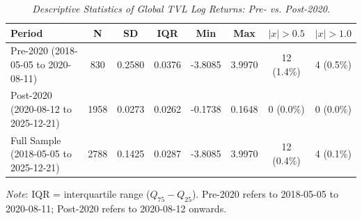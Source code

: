 \begin{table}[h]
  \centering
  \caption{\textit{Descriptive Statistics of Global TVL Log Returns: Pre- vs. Post-2020}.}
  \label{tab:tvldescstats20182025}
  \begin{tabular}{lccccccc}
    \toprule
    \textbf{Period} & \textbf{N} & \textbf{SD} & \textbf{IQR} & \textbf{Min} & \textbf{Max} & \textbf{$|x|>0.5$} & \textbf{$|x|>1.0$} \\ 
    \midrule
    Pre-2020 (2018-05-05 to 2020-08-11) & 830 & 0.2580 & 0.0376 & -3.8085 & 3.9970 & 12 (1.4\%) & 4 (0.5\%) \\ 
    Post-2020 (2020-08-12 to 2025-12-21) & 1958 & 0.0273 & 0.0262 & -0.1738 & 0.1648 & 0 (0.0\%) & 0 (0.0\%) \\ 
    Full Sample (2018-05-05 to 2025-12-21) & 2788 & 0.1425 & 0.0287 & -3.8085 & 3.9970 & 12 (0.4\%) & 4 (0.1\%) \\ 
    \bottomrule
  \end{tabular}
  \vspace{2pt}
  \footnotesize{\textit{Note}: IQR = interquartile range ($Q_{75}-Q_{25}$). Pre-2020 refers to 2018-05-05 to 2020-08-11; Post-2020 refers to 2020-08-12 onwards.}\\
\end{table}